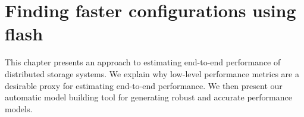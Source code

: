 \chapter{Finding faster configurations using flash}
\label{chapter:flash}

This chapter presents an approach to estimating end-to-end performance
of distributed storage systems.
We explain why low-level performance metrics are a desirable proxy
for estimating end-to-end performance.
We then present our automatic model building tool for generating
robust and accurate performance models.


